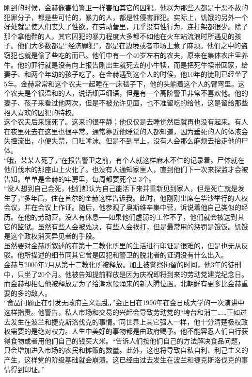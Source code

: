 刚到的时候，金赫像害怕警卫一样害怕其它的囚犯。他以为那些人都是十恶不赦的犯罪分子，都是些可怕的，暴力的人，都是性侵害罪犯。实际上，饥饿的另外一个好处就是使人们丧失了性欲。在劳动营里，几乎没有性行为，连打架都很少。除了那个拿他鞋的人，其它囚犯的暴力程度大多都不如他在火车站流浪时所遇见的孩子。他们大多数都是“经济罪犯”，都是在边境或者市场上惹了麻烦。他们之中的盗窃犯也就是偷了些吃的而已。他们中有一个40岁左右的农夫，原来在集体农庄里养牛。他的罪行就是没有向上报告刚出生就死去的小牛犊，而是把死牛犊带回家，给妻子、和两个年幼的孩子吃了。在金赫遇到这个人的时候，他10年的徒刑已经坐了5年。金赫常常和这个农夫一起睡在一床毯子下，他的头躺着这个人的臂弯里。这个农夫是个很温和的人，说话细声细语，但是有一个高阶警卫非常不喜欢他。他的妻子、孩子来看过他两次，但是不被允许见面，也不准留吃的给他，这是留给那些招人喜欢的囚犯的特权。\\

这个农夫后来饿死了。这来的很平静；他仅仅是去睡觉然后就再也没有起来。有人在夜里死去在这里也很平常。通常靠近他睡觉的人都知道，因为垂死的人的体液会失控流出，小便失禁，口吐唾沫。但是不到早上，没有人会那么麻烦去抬走他的尸体。\\

“哦，某某人死了，”在报告警卫之前，有个人就这样麻木不仁的记录着。尸体就在他们伐木的那座山上火化了。也没有人通知家里人，直到他们下一次来探监才会被告知。单单是金赫的牢房里，每周都要死个2-3个。\\

“没人想到自己会死，他们都认为自己能活下来并重新见到家人，但是死亡就是发生了，”多年后，住在首尔的金赫这样告诉我。此时，他刚刚出席在华沙举行的人权会议，并在会议上作证。随后，他参观了奥斯维辛集中营，诉说着他自己类似的经历。在他的劳动营，没人有休息──如果他们虚弱的工作不了，他们就会被送到其它的监狱。虽然有些人会被处决，有些人会挨打，但是最常用的惩罚是饿饭。饥饿是这个政权消灭异见者的手段。\\

虽然要对金赫所叙述的在第十二教化所里的生活进行印证是很难的，但是也无从反驳。他所描述的细节同其它曾是囚犯和警卫的脱北者的证词没有什么出入。\\

金赫与2000年7月从第十二教化所被释放。加上被警察拘留的时间，他3年的徒刑中，只坐了20个月。他被告知提前释放是因为庆祝即将到来的劳动党建党纪念日。而金赫却相信他被释放是为了给潮水般涌来的新人腾位置。北朝鲜有更多比金赫重要的多的敌人。\\

“食品问题正在引发无政府主义混乱，”金正日在1996年在金日成大学的一次演讲中这样指责。他警告，私人市场和交易的兴起会导致劳动党的“垮台和消亡……正如过去发生在波兰和捷克斯洛伐克的事情。”同世界上其它强人一样，他十分清楚极权政权需要的是绝对权力。人生中美好的事物都是由政府赐予。他不能容忍人们自行获得食物或者用他们自己的钱买大米。“告诉人们按他们自己的方法解决食品问题，只会增加进入市场的农民和摊贩的数量。此外，这也将导致自私自利、利己主义的产生，这样党的阶级基础就会崩溃。这已经由过去发生在波兰和捷克斯洛伐克的事情得到印证。”\\

